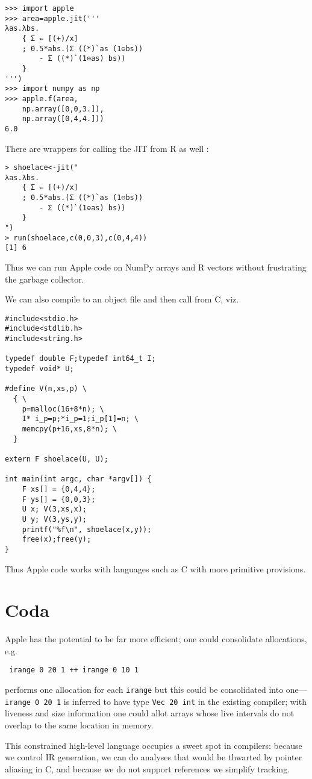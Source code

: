 \documentclass[sigplan,screen,anonymous]{acmart}
\begin{document}
\begin{verbatim}
>>> import apple
>>> area=apple.jit('''
λas.λbs.
    { Σ ⇐ [(+)/x]
    ; 0.5*abs.(Σ ((*)`as (1⊖bs))
        - Σ ((*)`(1⊖as) bs))
    }
''')
>>> import numpy as np
>>> apple.f(area,
    np.array([0,0,3.]),
    np.array([0,4,4.]))
6.0
\end{verbatim}

There are wrappers for calling the JIT from R as well \cite{wickham}:

\begin{verbatim}
> shoelace<-jit("
λas.λbs.
    { Σ ⇐ [(+)/x]
    ; 0.5*abs.(Σ ((*)`as (1⊖bs))
        - Σ ((*)`(1⊖as) bs))
    }
")
> run(shoelace,c(0,0,3),c(0,4,4))
[1] 6
\end{verbatim}

Thus we can run Apple code on NumPy arrays and R vectors without frustrating the garbage collector.

We can also compile to an object file and then call from C, viz.

\begin{verbatim}
#include<stdio.h>
#include<stdlib.h>
#include<string.h>

typedef double F;typedef int64_t I;
typedef void* U;

#define V(n,xs,p) \
  { \
    p=malloc(16+8*n); \
    I* i_p=p;*i_p=1;i_p[1]=n; \
    memcpy(p+16,xs,8*n); \
  }

extern F shoelace(U, U);

int main(int argc, char *argv[]) {
    F xs[] = {0,4,4};
    F ys[] = {0,0,3};
    U x; V(3,xs,x);
    U y; V(3,ys,y);
    printf("%f\n", shoelace(x,y));
    free(x);free(y);
}
\end{verbatim}

Thus Apple code works with languages such as C with more primitive provisions.

\section{Coda}

Apple has the potential to be far more efficient; one could consolidate allocations, e.g.

\begin{verbatim}
 irange 0 20 1 ++ irange 0 10 1
\end{verbatim}
performs one allocation for each {\tt irange} but this could be consolidated into one---{\tt irange 0 20 1} is inferred to have type {\tt Vec 20 int} in the existing compiler; with liveness and size information one could allot arrays whose live intervals do not overlap to the same location in memory.

This constrained high-level language occupies a sweet spot in compilers: because we control IR generation, we can do analyses that would be thwarted by pointer aliasing in C, and because we do not support references we simplify tracking.



\end{document}
